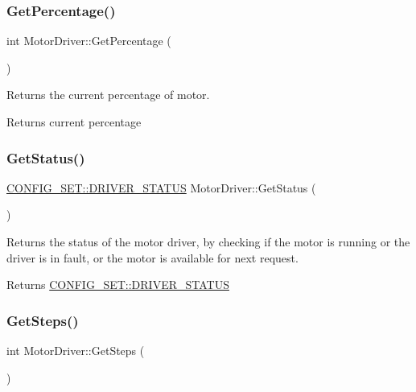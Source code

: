 \subsubsection{\texorpdfstring{Get\+Percentage()}{GetPercentage()}}
{\footnotesize\ttfamily int Motor\+Driver\+::\+Get\+Percentage (\begin{DoxyParamCaption}{ }\end{DoxyParamCaption})}



Returns the current percentage of motor. 

\begin{DoxyReturn}{Returns}
current percentage 
\end{DoxyReturn}
\mbox{\label{classMotorDriver_a1a33492e58ce3c13cd3c090c704b1734}} 
\subsubsection{\texorpdfstring{Get\+Status()}{GetStatus()}}
{\footnotesize\ttfamily \hyperlink{namespaceCONFIG__SET_a722f4ba49e35faf1a2504aa23677b2f0}{C\+O\+N\+F\+I\+G\+\_\+\+S\+E\+T\+::\+D\+R\+I\+V\+E\+R\+\_\+\+S\+T\+A\+T\+US} Motor\+Driver\+::\+Get\+Status (\begin{DoxyParamCaption}{ }\end{DoxyParamCaption})}



Returns the status of the motor driver, by checking if the motor is running or the driver is in fault, or the motor is available for next request. 

\begin{DoxyReturn}{Returns}
\hyperlink{namespaceCONFIG__SET_a722f4ba49e35faf1a2504aa23677b2f0}{C\+O\+N\+F\+I\+G\+\_\+\+S\+E\+T\+::\+D\+R\+I\+V\+E\+R\+\_\+\+S\+T\+A\+T\+US} 
\end{DoxyReturn}
\mbox{\label{classMotorDriver_aaf134c97d67e0ce422853cc1cb7684a9}} 
\subsubsection{\texorpdfstring{Get\+Steps()}{GetSteps()}}
{\footnotesize\ttfamily int Motor\+Driver\+::\+Get\+Steps (\begin{DoxyParamCaption}{ }\end{DoxyParamCaption})}



